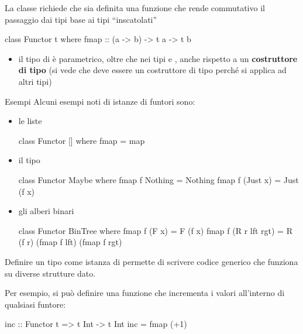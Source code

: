 \documentclass[a4paper,11pt]{report}
\begin{document}
La classe  richiede che sia definita una funzione  che rende commutativo il passaggio dai tipi base ai tipi ``inscatolati''

\begin{haskellbox}{}
class Functor t where
    fmap :: (a -> b) -> t a -> t b
\end{haskellbox}
\begin{itemize}
    \item il tipo di  è parametrico, oltre che nei tipi  e , anche rispetto a un \textbf{costruttore di tipo}  (si vede che  deve essere un costruttore di tipo perché si applica ad altri tipi)
\end{itemize}

\begin{gframe}{Esempi}
    Alcuni esempi noti di istanze di funtori sono:
    \begin{itemize}
        \item le liste
\begin{haskellbox}{}
class Functor [] where
    fmap = map
\end{haskellbox}

\item il tipo 
\begin{haskellbox}{}
class Functor Maybe where
    fmap f Nothing = Nothing
    fmap f (Just x) = Just (f x)
\end{haskellbox}

\item gli alberi binari
\begin{haskellbox}{}
class Functor BinTree where
    fmap f (F x) = F (f x)
    fmap f (R r lft rgt) = 
        R (f r) (fmap f lft) (fmap f rgt)
\end{haskellbox}
    \end{itemize}
\end{gframe}

Definire un tipo come istanza di  permette di scrivere codice generico che funziona su diverse strutture dato. 

Per esempio, si può definire una funzione  che incrementa i valori all'interno di qualsiasi funtore:
\begin{haskellbox}{}
inc :: Functor t => t Int -> t Int
inc = fmap (+1)
\end{haskellbox}
\end{document}
